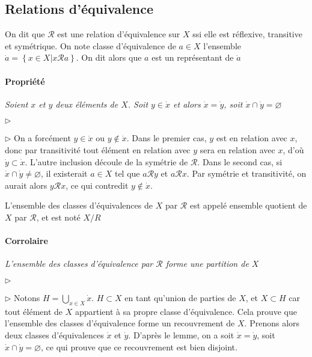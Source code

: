 \documentclass{scrartcl}
\begin{document}
		\subsection{Relations d'équivalence}
			On dit que $\mathcal{R}$ est une relation d'équivalence sur $X$ ssi elle est réflexive, transitive et symétrique.
			On note classe d'équivalence de $a\in X$ l'ensemble $\dot{a} = \left\{x\in X \big| x\mathcal{R}a\right\}$. On dit
			alors que $a$ est un représentant de $\dot{a}$

			\paragraph{Propriété} \textsl{Soient $x$ et $y$ deux éléments de $X$. 
				Soit $y\in\dot{x}$ et alors $\dot{x} = \dot{y}$, soit $\dot{x}\cap\dot{y} = \varnothing$}
			\begin{labeling}{$\triangleright$}
				\item [$\triangleright$] On a forcément $y \in \dot{x}$ ou $y\not\in\dot{x}$. Dans le premier cas,
				$y$ est en relation avec $x$, donc par transitivité tout élément en relation avec $y$ sera en relation avec
				$x$, d'où $\dot{y} \subset \dot{x}$. L'autre inclusion découle de la symétrie de $\mathcal{R}$. Dans le second
				cas, si $\dot{x}\cap\dot{y} \neq \varnothing$, il existerait $a\in X$ tel que $a\mathcal{R}y$ et $a\mathcal{R}x$.
				Par symétrie et transitivité, on aurait alors $y\mathcal{R}x$, ce qui contredit $y\not\in\dot{x}$.
			\end{labeling}

			L'ensemble des classes d'équivalences de $X$ par $\mathcal{R}$ est appelé ensemble quotient de $X$ par $\mathcal{R}$,
			et est noté $X/R$

			\paragraph{Corrolaire} \textsl{L'ensemble des classes d'équivalence par $\mathcal{R}$ forme une partition de $X$}
			\begin{labeling}{$\triangleright$}
				\item [$\triangleright$] Notons $H = \bigcup\limits_{x\in X} \dot{x}$. $H \subset X$ en tant qu'union de parties
				de $X$, et $X \subset H$ car tout élément de $X$ appartient à sa propre classe d'équivalence. 
				Cela prouve que l'ensemble des classes d'équivalence forme un recouvrement de $X$.
				Prenons alors deux classes d'équivalences $\dot{x}$ et $\dot{y}$. 
				D'après le lemme, on a soit $\dot{x}=\dot{y}$, soit $\dot{x}\cap\dot{y} = \varnothing$, 
				ce qui prouve que ce recouvrement est bien disjoint.
			\end{labeling}
\end{document}
